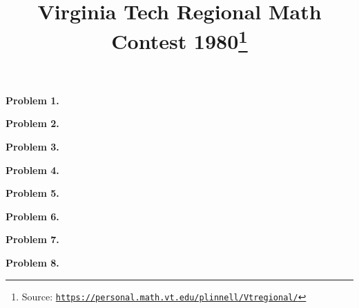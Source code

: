 \documentclass[10pt]{article}
\newcommand{\vtrmc}{https://personal.math.vt.edu/plinnell/Vtregional/}
\newcommand{\source}{\href{\vtrmc}{\texttt{\vtrmc}}}
\newcommand{\problem}[1]{\textbf{Problem #1.}}
\begin{document}
\title{Virginia Tech Regional Math Contest 1980\footnote{Source: \source}}
\author{\vspace{-2ex}}
\date{\vspace{-6ex}} %
\maketitle

\problem{1}


\problem{2}


\problem{3}


\problem{4}


\problem{5}


\problem{6}


\problem{7}


\problem{8}

\end{document}

